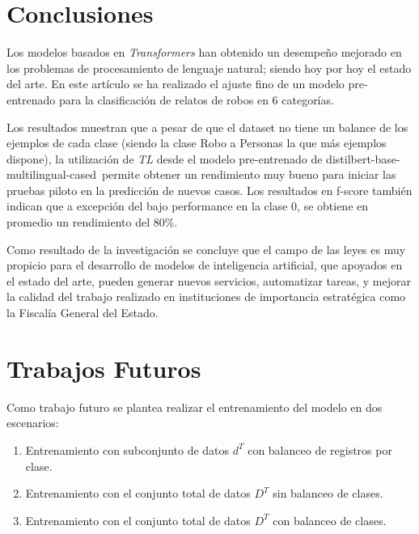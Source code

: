 \documentclass[onecolumn, journal, english, 12pt, a4paper]{IEEEtran} %
\newcommand{\modelohuggingface}{distilbert-base-multilingual-cased}
\theoremstyle{definition}
\begin{document}




\section{Conclusiones}\label{chap:conclusion}
Los modelos basados en \emph{Transformers} han obtenido un desempeño mejorado en los problemas de procesamiento de lenguaje natural; siendo hoy por hoy el estado del arte. En este artículo se ha realizado el ajuste fino de un modelo pre-entrenado para la clasificación de relatos de robos en 6 categorías. 

Los resultados muestran que a pesar de que el dataset no tiene un balance de los ejemplos de cada clase (siendo la clase Robo a Personas la que más ejemplos dispone), la utilización de \emph{TL} desde el modelo pre-entrenado de \modelohuggingface\, permite obtener un rendimiento muy bueno para iniciar las pruebas piloto en la predicción de nuevos casos. Los resultados en f-score también indican que a excepción del bajo performance en la clase 0, se obtiene en promedio un rendimiento del 80\%.

Como resultado de la investigación se concluye que el campo de las leyes es muy propicio para el desarrollo de modelos de inteligencia artificial, que apoyados en el estado del arte, pueden generar nuevos servicios, automatizar tareas, y mejorar la calidad del trabajo realizado en instituciones de importancia estratégica como la Fiscalía General del Estado.


\section{Trabajos Futuros}\label{chap:futuro}

Como trabajo futuro se plantea realizar el entrenamiento del modelo en dos escenarios: 

\begin{enumerate}
    \item Entrenamiento con subconjunto de datos $d^T$ con balanceo de registros por clase.
    \item Entrenamiento con el conjunto total de datos $D^T$ sin balanceo de clases.
    \item Entrenamiento con el conjunto total de datos $D^T$ con balanceo de clases.
\end{enumerate}
\end{document}
